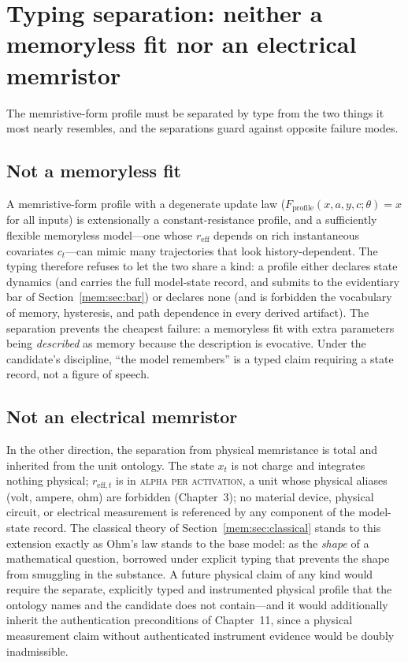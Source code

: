 \section{Typing separation: neither a memoryless fit nor an electrical memristor}\label{mem:sec:typing}

The memristive-form profile must be separated by type from the two things it most nearly resembles, and the separations guard against opposite failure modes.

\subsection{Not a memoryless fit}\label{mem:sec:notmemoryless}

A memristive-form profile with a degenerate update law ($F_{\mathrm{profile}}(x,a,y,c;\theta) = x$ for all inputs) is extensionally a constant-resistance profile, and a sufficiently flexible memoryless model---one whose $r_{\mathrm{eff}}$ depends on rich instantaneous covariates $c_t$---can mimic many trajectories that look history-dependent. The typing therefore refuses to let the two share a kind: a profile either declares state dynamics (and carries the full model-state record, and submits to the evidentiary bar of Section~\ref{mem:sec:bar}) or declares none (and is forbidden the vocabulary of memory, hysteresis, and path dependence in every derived artifact). The separation prevents the cheapest failure: a memoryless fit with extra parameters being \emph{described} as memory because the description is evocative. Under the candidate's discipline, ``the model remembers'' is a typed claim requiring a state record, not a figure of speech.

\subsection{Not an electrical memristor}\label{mem:sec:notelectrical}

In the other direction, the separation from physical memristance is total and inherited from the unit ontology. The state $x_t$ is not charge and integrates nothing physical; $r_{\mathrm{eff},t}$ is in \textsc{alpha per activation}, a unit whose physical aliases (volt, ampere, ohm) are forbidden (Chapter~3); no material device, physical circuit, or electrical measurement is referenced by any component of the model-state record. The classical theory of Section~\ref{mem:sec:classical} stands to this extension exactly as Ohm's law stands to the base model: as the \emph{shape} of a mathematical question, borrowed under explicit typing that prevents the shape from smuggling in the substance. A future physical claim of any kind would require the separate, explicitly typed and instrumented physical profile that the ontology names and the candidate does not contain---and it would additionally inherit the authentication preconditions of Chapter~11, since a physical measurement claim without authenticated instrument evidence would be doubly inadmissible.

